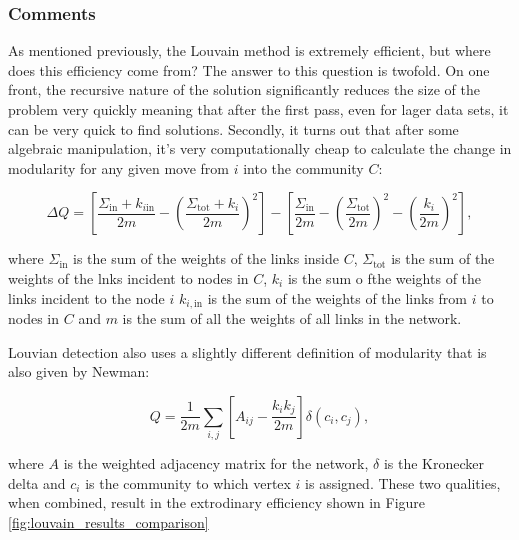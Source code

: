 \subsubsection*{Comments}
As mentioned previously, the Louvain method is extremely efficient, but where does this efficiency come from? The answer to this question is twofold. On one front, the recursive nature of the solution significantly reduces the size of the problem very quickly meaning that after the first pass, even for lager data sets, it can be very quick to find solutions. Secondly, it turns out that after some algebraic manipulation, it's very computationally cheap to calculate the change in modularity for any given move from $i$ into the community $C$:

$$ \Delta Q = \left [\frac{\Sigma_{\text{in}} + k_{i \text{in}}}{2m} - \left (\frac{\Sigma_{\text{tot}} + k_i}{2m} \right )^2 \right ] - \left [ \frac{\Sigma_{\text{in}}}{2m} - \left ( \frac{\Sigma_{\text{tot}}}{2m} \right )^2 - \left ( \frac{k_i}{2m} \right )^2\right ], $$

where $\Sigma_{\text{in}}$ is the sum of the weights of the links inside $C$, $\Sigma_{\text{tot}}$ is the sum of the weights of the lnks incident to nodes in $C$, $k_i$ is the sum o fthe weights of the links incident to the node $i$ $k_{i, \text{in}}$ is the sum of the weights of the links from $i$ to nodes in $C$ and $m$ is the sum of all the weights of all links in the network.

Louvian detection also uses a slightly different definition of modularity that is also given by Newman\cite{PhysRevE.70.056131}:

$$ Q = \frac{1}{2m} \sum_{i, j} \left [ A_{ij} - \frac{k_i k_j}{2m} \right ] \delta(c_i, c_j), $$

where $A$ is the weighted adjacency matrix for the network, $\delta$ is the Kronecker delta and $c_i$ is the community to which vertex $i$ is assigned. These two qualities, when combined, result in the extrodinary efficiency shown in Figure \ref{fig:louvain_results_comparison}
